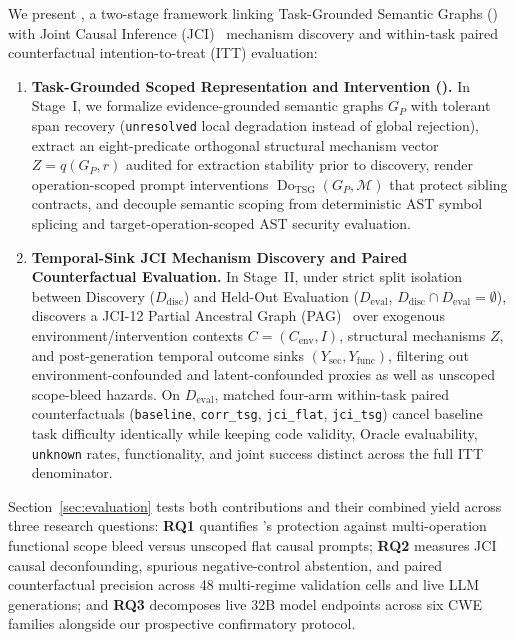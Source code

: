 We present \model, a two-stage framework linking Task-Grounded Semantic Graphs
(\prompttsg) with Joint Causal Inference (JCI)~\cite{mooij2020jci} mechanism
discovery and within-task paired counterfactual intention-to-treat (ITT)
evaluation:
\begin{enumerate}
  \item \textbf{Task-Grounded Scoped Representation and Intervention (\prompttsg).}
  In Stage~I, we formalize evidence-grounded semantic graphs $G_P$ with tolerant
  span recovery (\texttt{unresolved} local degradation instead of global
  rejection), extract an eight-predicate orthogonal structural mechanism vector
  $Z = q(G_P,r)$ audited for extraction stability prior to discovery, render
  operation-scoped prompt interventions $\operatorname{Do}_{\mathrm{TSG}}(G_P,
  \mathcal{M})$ that protect sibling contracts, and decouple semantic scoping
  from deterministic AST symbol splicing and target-operation-scoped AST
  security evaluation.
  \item \textbf{Temporal-Sink JCI Mechanism Discovery and Paired Counterfactual
  Evaluation.} In Stage~II, under strict split isolation between Discovery
  ($D_{\mathrm{disc}}$) and Held-Out Evaluation ($D_{\mathrm{eval}}$,
  $D_{\mathrm{disc}} \cap D_{\mathrm{eval}} = \emptyset$), \model discovers a
  JCI-12 Partial Ancestral Graph (PAG)~\cite{spirtes1995fci,zhang2008ancestral}
  over exogenous environment/intervention contexts $C=(C_{\mathrm{env}},I)$,
  structural mechanisms $Z$, and post-generation temporal outcome sinks
  $(Y_{\mathrm{sec}}, Y_{\mathrm{func}})$, filtering out environment-confounded
  and latent-confounded proxies as well as unscoped scope-bleed hazards. On
  $D_{\mathrm{eval}}$, matched four-arm within-task paired counterfactuals
  (\texttt{baseline}, \texttt{corr\_tsg}, \texttt{jci\_flat}, \texttt{jci\_tsg})
  cancel baseline task difficulty identically while keeping code validity,
  Oracle evaluability, \texttt{unknown} rates, functionality, and joint success
  distinct across the full ITT denominator.
\end{enumerate}

Section~\ref{sec:evaluation} tests both contributions and their combined yield
across three research questions: \textbf{RQ1} quantifies \prompttsg{}'s protection
against multi-operation functional scope bleed versus unscoped flat causal
prompts; \textbf{RQ2} measures JCI causal deconfounding, spurious negative-control
abstention, and paired counterfactual precision across 48 multi-regime
validation cells and live LLM generations; and \textbf{RQ3} decomposes live
32B model endpoints across six CWE families alongside our prospective
confirmatory protocol.
